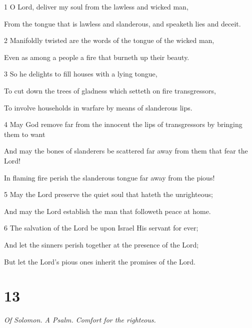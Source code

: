 \par 1 O Lord, deliver my soul from the lawless and wicked man,
\par  From the tongue that is lawless and slanderous, and speaketh lies and deceit.
\par 2 Manifoldly twisted are the words of the tongue of the wicked man,
\par  Even as among a people a fire that burneth up their beauty.
\par 3 So he delights to fill houses with a lying tongue,
\par  To cut down the trees of gladness which setteth on fire transgressors,
\par  To involve households in warfare by means of slanderous lips.
\par    
\par 4 May God remove far from the innocent the lips of transgressors by bringing them to want
\par  And may the bones of slanderers be scattered far away from them that fear the Lord!
\par  In flaming fire perish the slanderous tongue far away from the pious!
\par 5 May the Lord preserve the quiet soul that hateth the unrighteous;
\par  And may the Lord establish the man that followeth peace at home.
\par 6 The salvation of the Lord be upon Israel His servant for ever;
\par  And let the sinners perish together at the presence of the Lord;
\par  But let the Lord's pious ones inherit the promises of the Lord.

\chapter{13}

\par \textit{Of Solomon. A Psalm. Comfort for the righteous.}

